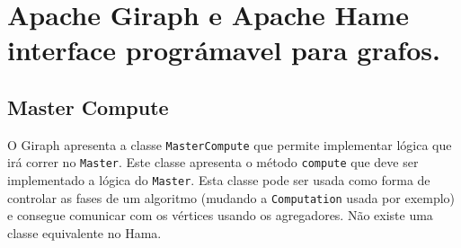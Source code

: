 \chapter{Apache Giraph e Apache Hame interface prográmavel para grafos.}

\section{Master Compute}

O Giraph apresenta a classe \texttt{MasterCompute} que permite implementar lógica que irá correr no \texttt{Master}. Este classe apresenta o método \texttt{compute} que deve ser implementado a lógica do \texttt{Master}. Esta classe pode ser usada como forma de controlar as fases de um algoritmo (mudando a \texttt{Computation} usada por exemplo) e consegue comunicar com os vértices usando os agregadores. Não existe uma classe equivalente no Hama.











